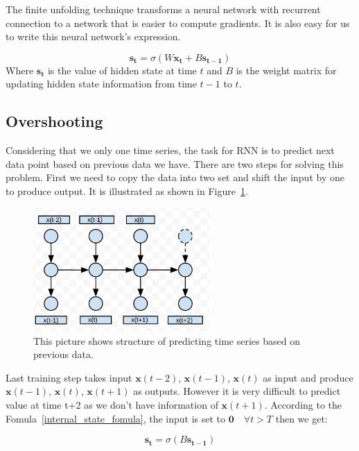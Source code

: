 \documentclass[officiallayout]{tktla}
\begin{document}
The finite unfolding technique transforms a neural network with recurrent connection to a network that is easier to compute gradients. It is also easy for us to write this neural network's expression.

\begin{equation}
\mathbf{s_{t}} = \sigma(W\mathbf{x_t} + B\mathbf{s_{t-1}})\label{internal_state_fomula}
\end{equation}
Where $\mathbf{s_t}$ is the value of hidden state at time $t$ and $B$ is the weight matrix for updating hidden state information from time $t-1$ to $t$.


\subsection{Overshooting}
Considering that we only one time series, the task for RNN is to predict next data point based on previous data we have. There are two steps for solving this problem. First we need to copy the data into two set and shift the input by one to produce output. It is illustrated as shown in Figure~\ref{overshot_rnn}.

\begin{figure}[h!]
  \centering
    \includegraphics[width=0.6\textwidth]{overshot_rnn}
  \caption{This picture shows structure of predicting time series based on previous data.}\label{overshot_rnn}
\end{figure}

Last training step takes input $\mathbf{x}(t-2)$, $\mathbf{x}(t-1)$, $\mathbf{x}(t)$ as input and produce $\mathbf{x}(t-1)$, $\mathbf{x}(t)$, $\mathbf{x}(t+1)$ as outputs. However it is very difficult to predict value at time t+2 as we don't have information of $\mathbf{x}(t+1)$. According to the Fomula~\ref{internal_state_fomula}, the input is set to $\mathbf{0}\quad \forall t > T$ then we get:

\begin{equation}
\mathbf{s_{t}} = \sigma(B\mathbf{s_{t-1}})\label{overshot_formula}
\end{equation}
\end{document}
